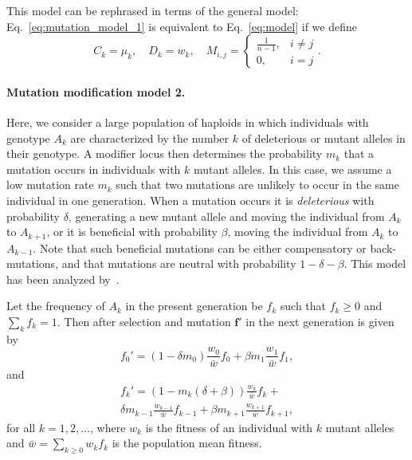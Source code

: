 \documentclass[9pt, a4paper, twocolumn]{extarticle}
\let\vec\mathbf
\begin{document}
This model can be rephrased in terms of the general model: 
Eq.~\ref{eq:mutation_model_1} is equivalent to Eq.~\ref{eq:model} if we define
\begin{equation} 
C_k = \mu_k, \quad
D_k = w_k, \quad
M_{i,j} = \begin{cases}
\frac{1}{n-1}, & i \ne j \\
0, & i=j
\end{cases}.
\end{equation}

\paragraph*{Mutation modification model 2.}\label{sec:mut_model_2}

Here, we consider a large population of haploids in which individuals with genotype $A_k$ are characterized by the number $k$ of deleterious or mutant alleles in their genotype.
A modifier locus then determines the probability $m_k$ that a mutation occurs in individuals with $k$ mutant alleles.
In this case, we assume a low mutation rate $m_k$ such that two mutations are unlikely to occur in the same individual in one generation.
When a mutation occurs it is \emph{deleterious} with probability $\delta$, generating a new mutant allele and moving the individual from $A_k$ to $A_{k+1}$, or it is beneficial with probability $\beta$, moving the individual from $A_k$ to $A_{k-1}$.
Note that such beneficial mutations can be either compensatory or back-mutations, and that mutations are neutral with probability $1-\delta-\beta$.
This model has been analyzed by~\citet{Ram2012}.

Let the frequency of $A_k$ in the present generation be $f_k$ such that $f_k \ge 0$ and $\sum_k{f_k}=1$.
Then after selection and mutation $\vec{f'}$ in the next generation is given by
\begin{equation}
f_0' = (1 - \delta m_0) \frac{w_0}{\bar{w}} f_0 + \beta m_{1} \frac{w_{1}}{\bar{w}} f_{1},
\end{equation}
and
\begin{multline}
f_k' = (1 - m_k(\delta+\beta)) \frac{w_k}{\bar{w}} f_k + \\
\delta m_{k-1} \frac{w_{k-1}}{\bar{w}} f_{k-1} + \beta m_{k+1} \frac{w_{k+1}}{\bar{w}} f_{k+1},
\label{eq:mutation_model_2}
\end{multline}
for all $k=1,2,\ldots$, where $w_k$ is the fitness of an individual with $k$ mutant alleles and $\bar{w} = \sum_{k \ge 0}{w_k f_k}$ is the population mean fitness.
\end{document}
